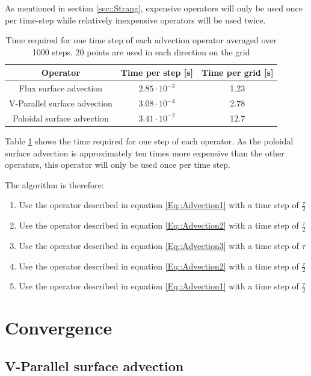 As mentioned in section \ref{sec::Strang}, expensive operators will only be used once per time-step while relatively inexpensive operators will be used twice.

\begin{table}[ht]
 \centering
 \begin{tabular}{|c|c|c|}
  \hline
  Operator & Time per step [s] & Time per grid [s]\\
  \hline
  Flux surface advection & $2.85\cdot 10^{-3}$ & 1.23\\
  \hline
  V-Parallel surface advection & $3.08\cdot 10^{-4}$ & 2.78\\
  \hline
  Poloidal surface advection & $3.41\cdot 10^{-2}$ & 12.7\\
  \hline
 \end{tabular}
 \caption{\label{tab::advection time}Time required for one time step of each advection operator averaged over 1000 steps. 20 points are used in each direction on the grid}
\end{table}

Table \ref{tab::advection time} shows the time required for one step of each operator. As the poloidal surface advection is approximately ten times more expensive than the other operators, this operator will only be used once per time step.

The algorithm is therefore:
\begin{enumerate}[noitemsep]
 \item Use the operator described in equation \ref{Eq::Advection1} with a time step of $\frac{\tau}{2}$
 \item Use the operator described in equation \ref{Eq::Advection2} with a time step of $\frac{\tau}{2}$
 \item Use the operator described in equation \ref{Eq::Advection3} with a time step of $\tau$
 \item Use the operator described in equation \ref{Eq::Advection2} with a time step of $\frac{\tau}{2}$
 \item Use the operator described in equation \ref{Eq::Advection1} with a time step of $\frac{\tau}{2}$
\end{enumerate}


\section{Convergence}

\subsection{V-Parallel surface advection}

